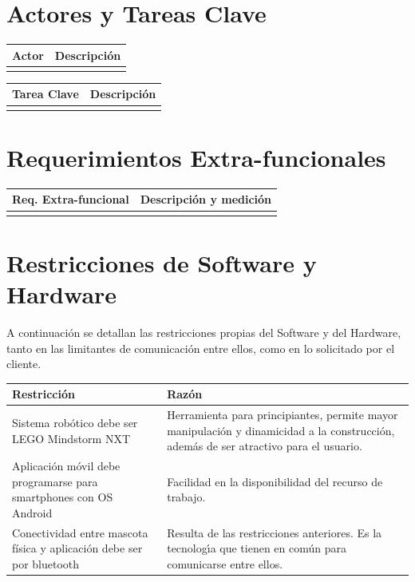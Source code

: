 \documentclass[letterpaper,12pt]{article} %
\numberwithin{equation}{section} %
\numberwithin{figure}{section} %
\numberwithin{table}{section} %
\begin{document}
\newpage
\section{Actores y Tareas Clave}

\begin{table}[hb!]
  \begin{tabular}{lp{7cm}}\hline
    Actor & Descripci\'on \\ \hline \hline %
    & \\ \hline    
  \end{tabular}
\end{table}

\begin{table}[hb!]
  \begin{tabular}{lp{7cm}}\hline
    Tarea Clave & Descripci\'on \\ \hline\hline %
    & \\ \hline
  \end{tabular}
\end{table}

\newpage
\section{Requerimientos Extra-funcionales}

\begin{table}[hb!]
  \begin{tabular}{lp{7cm}}\hline 
    Req. Extra-funcional & Descripci\'on y medici\'on \\ \hline\hline %
    & \\ \hline
  \end{tabular}
\end{table}

\newpage
\section{Restricciones de Software y Hardware}

A continuaci\'on se detallan las restricciones propias del Software y del Hardware, tanto en las limitantes de comunicaci\'on entre ellos, como en lo solicitado por el cliente.

\begin{table}[hb!]
  \begin{tabular}{p{3cm}p{7cm}}\hline
    Restricci\'on & Raz\'on \\ \hline\hline %
    Sistema rob\'otico debe ser LEGO Mindstorm NXT & Herramienta para principiantes, permite mayor manipulaci\'on y dinamicidad a la construcci\'on, adem\'as de ser atractivo para el usuario.\\ \hline
    Aplicaci\'on m\'ovil debe programarse para smartphones con OS Android & Facilidad en la disponibilidad del recurso de trabajo. \\ \hline
    Conectividad entre mascota f\'isica y aplicaci\'on debe ser por bluetooth & Resulta de las restricciones anteriores. Es la tecnolog\'{\i}a que tienen en com\'un para comunicarse entre ellos.\\ \hline \hline
  \end{tabular}
\end{table}
\end{document}
